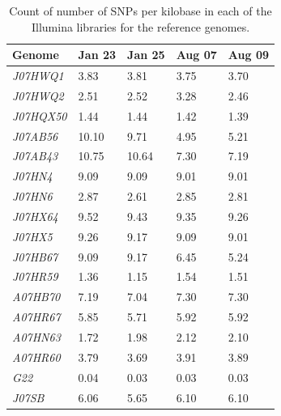 \begin{table}[ht]
  \caption{Count of number of SNPs per kilobase in each of the Illumina libraries for the reference genomes.}
  \begin{tabularx}{\textwidth}{L{2.2cm}R{2cm}R{3cm}R{3.2cm}R{2cm}}
  \hline
    \textbf{Genome} & \textbf{Jan 23} & \textbf{Jan 25} & \textbf{Aug 07} & \textbf{Aug 09} \\
    \hline
     \textit{J07HWQ1} & 3.83 & 3.81 & 3.75 & 3.70 \\
     \textit{J07HWQ2} & 2.51 & 2.52 & 3.28 & 2.46 \\
     \textit{J07HQX50} & 1.44 & 1.44 & 1.42 & 1.39 \\
     \textit{J07AB56} & 10.10 & 9.71 & 4.95 & 5.21 \\
     \textit{J07AB43} & 10.75 & 10.64 & 7.30 & 7.19 \\
     \textit{J07HN4} & 9.09 & 9.09 & 9.01 & 9.01 \\
     \textit{J07HN6} & 2.87 & 2.61 & 2.85 & 2.81 \\
     \textit{J07HX64} & 9.52 & 9.43 & 9.35 & 9.26 \\
     \textit{J07HX5} & 9.26 & 9.17 & 9.09 & 9.01 \\
     \textit{J07HB67} & 9.09 & 9.17 & 6.45 & 5.24 \\
     \textit{J07HR59} & 1.36 & 1.15 & 1.54 & 1.51 \\
     \textit{A07HB70} & 7.19 & 7.04 & 7.30 & 7.30 \\
     \textit{A07HR67} & 5.85 & 5.71 & 5.92 & 5.92 \\
     \textit{A07HN63} & 1.72 & 1.98 & 2.12 & 2.10 \\
     \textit{A07HR60} & 3.79 & 3.69 & 3.91 & 3.89 \\
     \textit{G22} & 0.04 & 0.03 & 0.03 & 0.03 \\
     \textit{J07SB} & 6.06 & 5.65 & 6.10 & 6.10 \\     
  \end{tabularx}
  \label{SNPS_KB}
\end{table}


